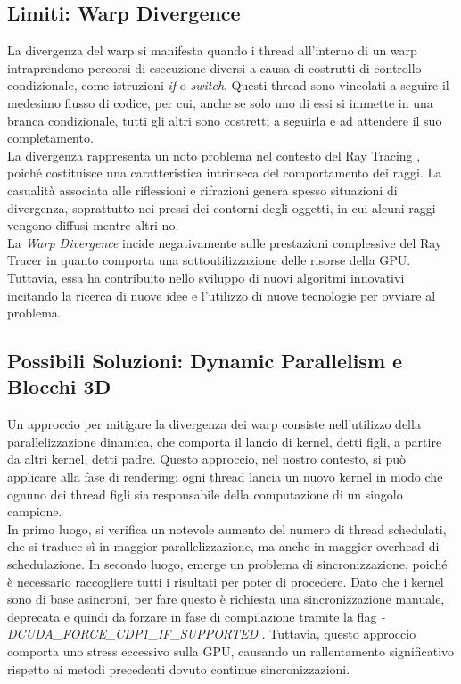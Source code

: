\documentclass[main.tex]{subfiles}
\begin{document}
\subsection{Limiti: Warp Divergence}
\hspace*{0.25in}La divergenza del warp si manifesta quando i thread all'interno di un warp intraprendono percorsi di esecuzione diversi a causa di costrutti di controllo condizionale, come istruzioni \textit{if} o \textit{switch}. Questi thread sono vincolati a seguire il medesimo flusso di codice, per cui, anche se solo uno di essi si immette in una branca condizionale, tutti gli altri sono costretti a seguirla e ad attendere il suo completamento.\\
La divergenza rappresenta un noto problema nel contesto del Ray Tracing \cite{divergence}, poiché costituisce una caratteristica intrinseca del comportamento dei raggi. La casualità associata alle riflessioni e rifrazioni genera spesso situazioni di divergenza, soprattutto nei pressi dei contorni degli oggetti, in cui alcuni raggi vengono diffusi mentre altri no.\\
La \textit{Warp Divergence} incide negativamente sulle prestazioni complessive del Ray Tracer in quanto comporta una sottoutilizzazione delle risorse della GPU. Tuttavia, essa ha contribuito nello sviluppo di nuovi algoritmi innovativi incitando la ricerca di nuove idee e l'utilizzo di nuove tecnologie per ovviare al problema.

\subsection{Possibili Soluzioni: Dynamic Parallelism e Blocchi 3D }
\hspace*{0.25in}Un approccio per mitigare la divergenza dei warp consiste nell'utilizzo della parallelizzazione dinamica, che comporta il lancio di kernel, detti figli, a partire da altri kernel, detti padre. Questo approccio, nel nostro contesto, si può applicare alla fase di rendering: ogni thread lancia un nuovo kernel in modo che ognuno dei thread figli sia responsabile della computazione di un singolo campione.\\
In primo luogo, si verifica un notevole aumento del numero di thread schedulati, che si traduce sì in maggior parallelizzazione, ma anche in maggior overhead di schedulazione. In secondo luogo, emerge un problema di sincronizzazione, poiché è necessario raccogliere tutti i risultati per poter di procedere. Dato che i kernel sono di base asincroni, per fare questo è richiesta una sincronizzazione manuale, deprecata e quindi da forzare in fase di compilazione tramite la flag \textit{-DCUDA\_FORCE\_CDP1\_IF\_SUPPORTED} \cite{man}. Tuttavia, questo approccio comporta uno stress eccessivo sulla GPU, causando un rallentamento significativo rispetto ai metodi precedenti dovuto continue sincronizzazioni.
\end{document}
